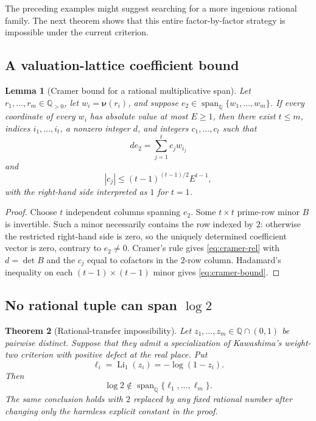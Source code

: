 \documentclass[11pt]{article}
\newtheorem{theorem}{Theorem}[section]
\newtheorem{lemma}[theorem]{Lemma}
\theoremstyle{definition}
\newcommand{\Q}{\mathbb Q}
\newcommand{\Li}{\operatorname{Li}}
\newcommand{\Span}{\operatorname{span}}
\newcommand{\val}{\boldsymbol\nu}
\begin{document}
The preceding examples might suggest searching for a more ingenious rational family.  The
next theorem shows that this entire factor-by-factor strategy is impossible under the current
criterion.

\subsection{A valuation-lattice coefficient bound}

\begin{lemma}[Cramer bound for a rational multiplicative span]\label{lem:cramer}
Let $r_1,\ldots,r_m\in\Q_{>0}$, let
$w_i=\val(r_i)$, and suppose $e_2\in\Span_\Q\{w_1,\ldots,w_m\}$.  If every coordinate of
every $w_i$ has absolute value at most $E\ge1$, then there exist
$t\le m$, indices $i_1,\ldots,i_t$, a nonzero integer $d$, and integers
$c_1,\ldots,c_t$ such that
\begin{equation}\label{eq:cramer-rel}
  d e_2=\sum_{j=1}^t c_jw_{i_j}
\end{equation}
and
\begin{equation}\label{eq:cramer-bound}
  |c_j|\le (t-1)^{(t-1)/2}E^{t-1},
\end{equation}
with the right-hand side interpreted as $1$ for $t=1$.
\end{lemma}

\begin{proof}
Choose $t$ independent columns spanning $e_2$.  Some $t\times t$ prime-row minor $B$ is
invertible.  Such a minor necessarily contains the row indexed by $2$: otherwise the
restricted right-hand side is zero, so the uniquely determined coefficient vector is zero,
contrary to $e_2\ne0$.  Cramer's rule gives \eqref{eq:cramer-rel} with
$d=\det B$ and the $c_j$ equal to cofactors in the $2$-row column.  Hadamard's inequality on
each $(t-1)\times(t-1)$ minor gives \eqref{eq:cramer-bound}.
\end{proof}

\subsection[No rational tuple can span log 2]{No rational tuple can span $\log 2$}

\begin{theorem}[Rational-transfer impossibility]\label{thm:rational-transfer}
Let $z_1,\ldots,z_m\in\Q\cap(0,1)$ be pairwise distinct.  Suppose that they admit a
specialization of Kawashima's weight-two criterion with positive defect at the real place.
Put
\[
  \ell_i=\Li_1(z_i)=-\log(1-z_i).
\]
Then
\begin{equation}\label{eq:log2-notspan}
  \log2\notin\Span_\Q\{\ell_1,\ldots,\ell_m\}.
\end{equation}
The same conclusion holds with $2$ replaced by any fixed rational number after changing only
the harmless explicit constant in the proof.
\end{theorem}
\end{document}
